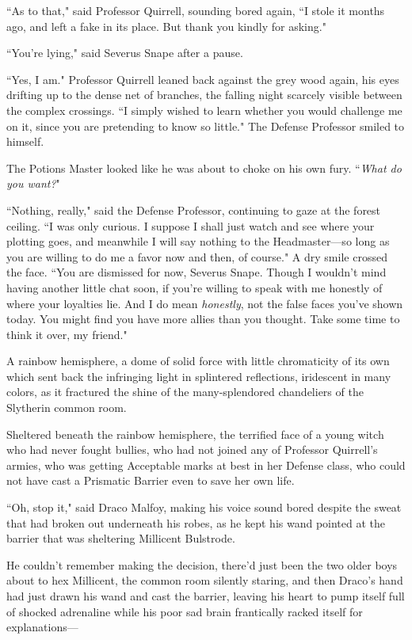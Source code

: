 ``As to that," said Professor Quirrell, sounding bored again, ``I stole it months ago, and left a fake in its place. But thank you kindly for asking."

``You're lying," said Severus Snape after a pause.

``Yes, I am." Professor Quirrell leaned back against the grey wood again, his eyes drifting up to the dense net of branches, the falling night scarcely visible between the complex crossings. ``I simply wished to learn whether you would challenge me on it, since you are pretending to know so little." The Defense Professor smiled to himself.

The Potions Master looked like he was about to choke on his own fury. ``\emph{What do you want?}"

``Nothing, really," said the Defense Professor, continuing to gaze at the forest ceiling. ``I was only curious. I suppose I shall just watch and see where your plotting goes, and meanwhile I will say nothing to the Headmaster---so long as you are willing to do me a favor now and then, of course." A dry smile crossed the face. ``You are dismissed for now, Severus Snape. Though I wouldn't mind having another little chat soon, if you're willing to speak with me honestly of where your loyalties lie. And I do mean \emph{honestly}, not the false faces you've shown today. You might find you have more allies than you thought. Take some time to think it over, my friend."


A rainbow hemisphere, a dome of solid force with little chromaticity of its own which sent back the infringing light in splintered reflections, iridescent in many colors, as it fractured the shine of the many-splendored chandeliers of the Slytherin common room.

Sheltered beneath the rainbow hemisphere, the terrified face of a young witch who had never fought bullies, who had not joined any of Professor Quirrell's armies, who was getting Acceptable marks at best in her Defense class, who could not have cast a Prismatic Barrier even to save her own life.

``Oh, stop it," said Draco Malfoy, making his voice sound bored despite the sweat that had broken out underneath his robes, as he kept his wand pointed at the barrier that was sheltering Millicent Bulstrode.

He couldn't remember making the decision, there'd just been the two older boys about to hex Millicent, the common room silently staring, and then Draco's hand had just drawn his wand and cast the barrier, leaving his heart to pump itself full of shocked adrenaline while his poor sad brain frantically racked itself for explanations---

